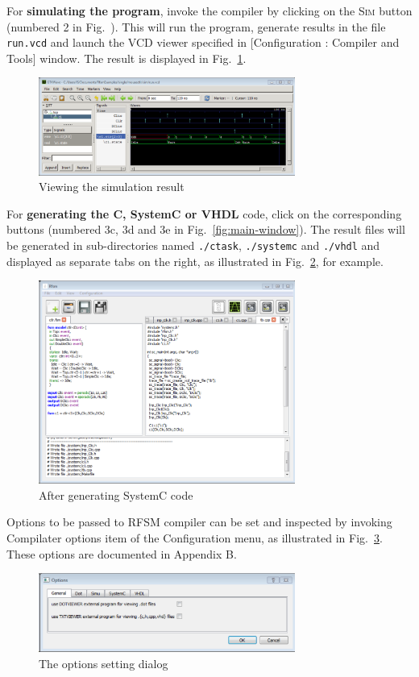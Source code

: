 \medskip For \textbf{simulating the program}, invoke the compiler by clicking on the \textsc{Sim}
button (numbered 2 in Fig.~\pageref{fig:main-window}). This will run the program, generate results
in the file \texttt{run.vcd} and launch the VCD viewer specified in 
  [\textsf{Configuration : Compiler and Tools}] window.
The result is displayed in Fig.~\ref{fig:make-sim}.

\begin{figure}[h]
  \centering
  \includegraphics[width=0.75\textwidth]{figs/gui/make-sim}
  \caption{Viewing the simulation result}
  \label{fig:make-sim}
\end{figure}

\medskip
For \textbf{generating the C, SystemC or VHDL} code,
click on the corresponding buttons (numbered \textsf{3c}, \textsf{3d} and \textsf{3e} in
Fig.~\ref{fig:main-window}). The result files will be generated in sub-directories named \verb|./ctask|, \verb|./systemc| and
\verb|./vhdl| and displayed as separate tabs on the
right, as illustrated in Fig.~\ref{fig:make-systemc}, for example.

\begin{figure}[h]
  \centering
  \includegraphics[width=0.75\textwidth]{figs/gui/make-systemc}
  \caption{After generating SystemC code}
  \label{fig:make-systemc}
\end{figure}

\medskip
Options to be passed to RFSM compiler can be set and inspected by invoking \textsf{Compilater options} item of the
\textsf{Configuration} menu, as illustrated in Fig.~\ref{fig:options}. These options are
documented in Appendix B.

\begin{figure}[h]
  \centering
  \includegraphics[width=0.75\textwidth]{figs/gui/options}
  \caption{The options setting dialog}
  \label{fig:options}
\end{figure}

